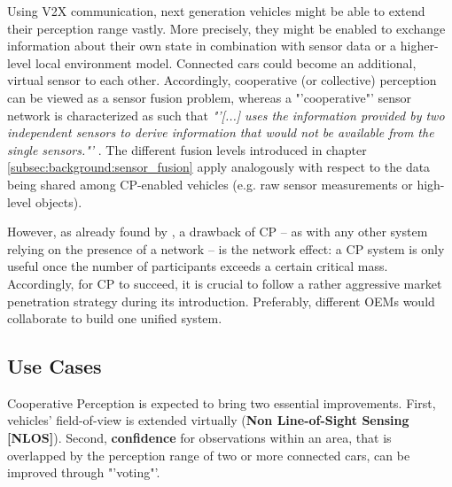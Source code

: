 Using V2X communication, next generation vehicles might be able to extend their perception range vastly. More precisely, they might be enabled to exchange information about their own state in combination with sensor data or a higher-level local environment model. Connected cars could become an additional, virtual sensor to each other. Accordingly, cooperative (or collective) perception can be viewed as a sensor fusion problem, whereas a "'cooperative"' sensor network is characterized as such that \textit{"'[...] uses the information provided by two independent sensors to derive information that would not be available from the single sensors."'} \cite{Elmenreich2002}. The different fusion levels introduced in chapter \ref{subsec:background:sensor_fusion} apply analogously with respect to the data being shared among CP-enabled vehicles (e.g. raw sensor measurements or high-level objects).

However, as already found by \cite{Gunther2015}, a drawback of CP – as with any other system relying on the presence of a network – is the network effect: a CP system is only useful once the number of participants exceeds a certain critical mass. Accordingly, for CP to succeed, it is crucial to follow a rather aggressive market penetration strategy during its introduction. Preferably, different OEMs would collaborate to build one unified system.

\subsection{Use Cases}
\label{subsec:background:use_cases}
Cooperative Perception is expected to bring two essential improvements. First, vehicles' field-of-view is extended virtually (\textbf{Non Line-of-Sight Sensing [NLOS]}). Second, \textbf{confidence} for observations within an area, that is overlapped by the perception range of two or more connected cars, can be improved through "'voting"'.

